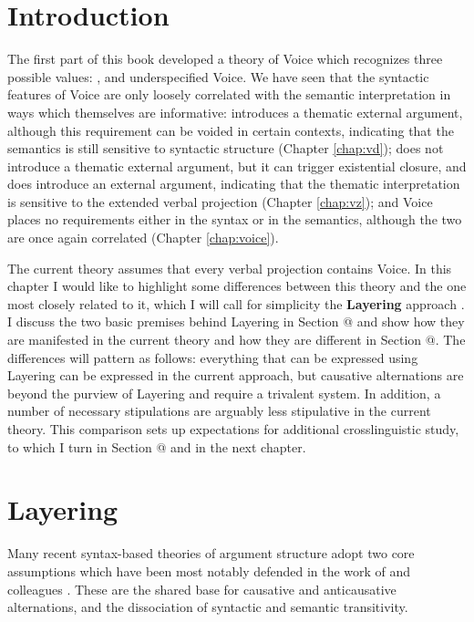 \label{chap:aas}
\section{Introduction} \label{sec:intro}
The first part of this book developed a theory of Voice which recognizes three possible values: {\vd}, {\vz} and underspecified Voice. We have seen that the syntactic features of Voice are only loosely correlated with the semantic interpretation in ways which themselves are informative: {\vd} introduces a thematic external argument, although this requirement can be voided in certain contexts, indicating that the semantics is still sensitive to syntactic structure (Chapter \ref{chap:vd}); {\vz} does not introduce a thematic external argument, but it can trigger existential closure, and {\pz} does introduce an external argument, indicating that the thematic interpretation is sensitive to the extended verbal projection (Chapter \ref{chap:vz}); and Voice places no requirements either in the syntax or in the semantics, although the two are once again correlated (Chapter \ref{chap:voice}).

The current theory assumes that every verbal projection contains Voice. In this chapter I would like to highlight some differences between this theory and the one most closely related to it, which I will call for simplicity the \textbf{Layering} approach \citep{schaefer08,layering15}. I discuss the two basic premises behind Layering in Section @ and show how they are manifested in the current theory and how they are different in Section @. The differences will pattern as follows: everything that can be expressed using Layering can be expressed in the current approach, but causative alternations are beyond the purview of Layering and require a trivalent system. In addition, a number of necessary stipulations are arguably less stipulative in the current theory. This comparison sets up expectations for additional crosslinguistic study, to which I turn in Section @ and in the next chapter.


\section{Layering}
Many recent syntax-based theories of argument structure adopt two core assumptions which have been most notably defended in the work of \cite{schaefer08} and colleagues \citep{alexiadouetal06,layering15}. These are the shared base for causative and anticausative alternations, and the dissociation of syntactic and semantic transitivity.

